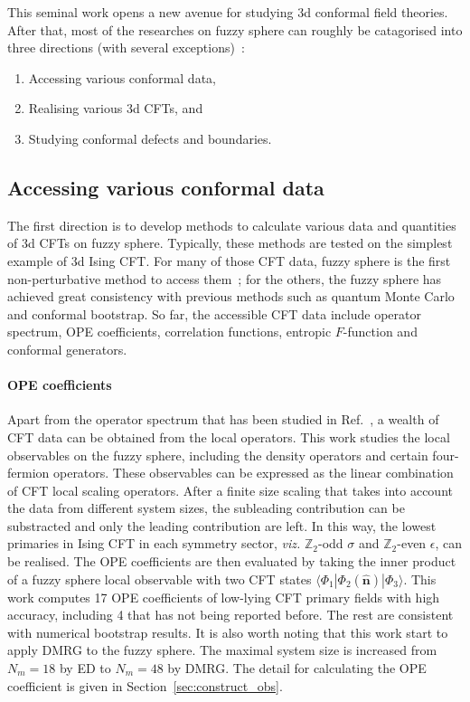 \documentclass{timesjhep}
\begin{document}
This seminal work opens a new avenue for studying 3d conformal field theories. After that, most of the researches on fuzzy sphere can roughly be catagorised into three directions (with several exceptions)~: 

\begin{enumerate} 
    \item Accessing various conformal data, 
    \item Realising various 3d CFTs, and 
    \item Studying conformal defects and boundaries.
\end{enumerate} 

\subsection{Accessing various conformal data}

The first direction is to develop methods to calculate various data and quantities of 3d CFTs on fuzzy sphere. Typically, these methods are tested on the simplest example of 3d Ising CFT. For many of those CFT data, fuzzy sphere is the first non-perturbative method to access them~; for the others, the fuzzy sphere has achieved great consistency with previous methods such as quantum Monte Carlo and conformal bootstrap. So far, the accessible CFT data include operator spectrum, OPE coefficients, correlation functions, entropic $F$-function and conformal generators. 

\paragraph{OPE coefficients~\cite{Hu2023Mar}}

Apart from the operator spectrum that has been studied in Ref.~\cite{}, a wealth of CFT data can be obtained from the local operators. This work studies the local observables on the fuzzy sphere, including the density operators and certain four-fermion operators. These observables can be expressed as the linear combination of CFT local scaling operators. After a finite size scaling that takes into account the data from different system sizes, the subleading contribution can be substracted and only the leading contribution are left. In this way, the lowest primaries in Ising CFT in each symmetry sector, \textit{viz.} $\mathbb{Z}_2$-odd $\sigma$ and $\mathbb{Z}_2$-even $\epsilon$, can be realised. The OPE coefficients are then evaluated by taking the inner product of a fuzzy sphere local observable with two CFT states $\langle\Phi_1|\Phi_2(\hat{\mathbf{n}})|\Phi_3\rangle$. This work computes 17 OPE coefficients of low-lying CFT primary fields with high accuracy, including 4 that has not being reported before. The rest are consistent with numerical bootstrap results. It is also worth noting that this work start to apply DMRG to the fuzzy sphere. The maximal system size is increased from $N_m=18$ by ED to $N_m=48$ by DMRG. The detail for calculating the OPE coefficient is given in Section~\ref{sec:construct_obs}.
\end{document}
